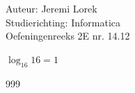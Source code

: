 \documentclass[a4paper]{article}
\begin{document}
  
\noindent \large Auteur: Jeremi Lorek\\
\noindent \large Studierichting: Informatica\\
\noindent \large Oefeningenreeks 2E nr. 14.12\\

\medskip
\normalsize

$\log_{16} 16 = 1$  \\

\begin{thebibliography}{999}
\end{thebibliography}
\end{document}
